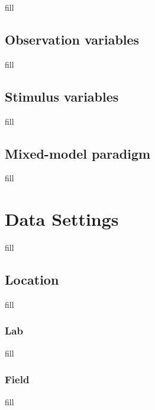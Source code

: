 \documentclass[
  b5paper]{book}
\begin{document}
fill

\hypertarget{observation-variables}{%
\subsection*{Observation variables}\label{observation-variables}}

fill

\hypertarget{stimulus-variables}{%
\subsection*{Stimulus variables}\label{stimulus-variables}}

fill

\hypertarget{mixed-model-paradigm}{%
\subsection*{Mixed-model paradigm}\label{mixed-model-paradigm}}

fill

\hypertarget{data-settings}{%
\section{Data Settings}\label{data-settings}}

fill

\hypertarget{location}{%
\subsection*{Location}\label{location}}

fill

\hypertarget{lab}{%
\subsubsection*{Lab}\label{lab}}

fill

\hypertarget{field}{%
\subsubsection*{Field}\label{field}}

fill
\end{document}
